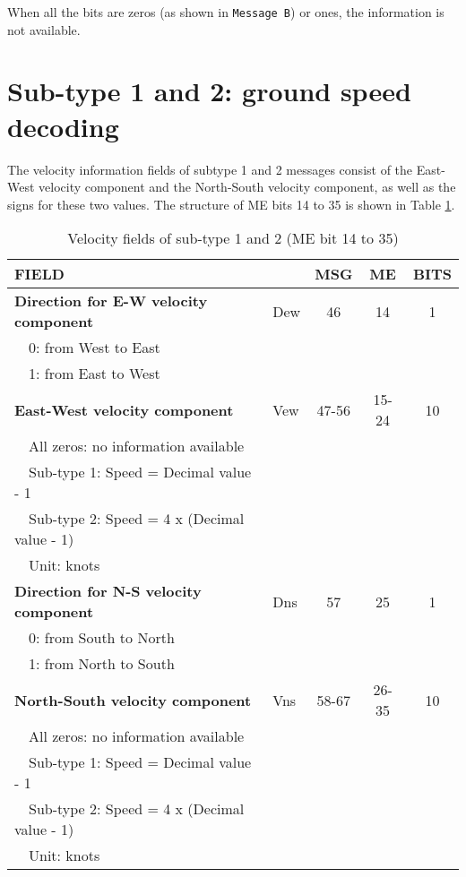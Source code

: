 When all the bits are zeros (as shown in \texttt{Message B}) or ones, the information is not available.


\section{Sub-type 1 and 2: ground speed decoding}

The velocity information fields of subtype 1 and 2 messages consist of the East-West velocity component and the North-South velocity component, as well as the signs for these two values. The structure of ME bits 14 to 35 is shown in Table \ref{tb:adsb-velocity-bits-14-35-gs}.


\begin{table}[ht]
\caption{Velocity fields of sub-type 1 and 2 (ME bit 14 to 35)}
\label{tb:adsb-velocity-bits-14-35-gs}
\footnotesize
\begin{tabular}{|l|l|c|c|c|}
\hline
\textbf{FIELD} & & \textbf{MSG} & \textbf{ME} & \textbf{BITS} \\ \hline
\textbf{Direction for E-W velocity component} & Dew & 46 & 14 & 1\\
~~0: from West to East &&&&\\
~~1: from East to West &&&& \\ \hline
\textbf{East-West velocity component} & Vew & 47-56 & 15-24 & 10\\
~~All zeros: no information available &&&& \\
~~Sub-type 1: Speed = Decimal value - 1 &&&& \\
~~Sub-type 2: Speed = 4 x (Decimal value - 1) &&&& \\
~~Unit: knots &&&& \\ \hline
\textbf{Direction for N-S velocity component} & Dns & 57 & 25 & 1 \\
~~0: from South to North &&&& \\
~~1: from North to South &&&& \\ \hline
\textbf{North-South velocity component} & Vns & 58-67 & 26-35 & 10\\
~~All zeros: no information available &&&&\\
~~Sub-type 1: Speed = Decimal value - 1 &&&&\\
~~Sub-type 2: Speed = 4 x (Decimal value - 1) &&&&\\
~~Unit: knots &&&& \\ \hline
\end{tabular}
\end{table}

